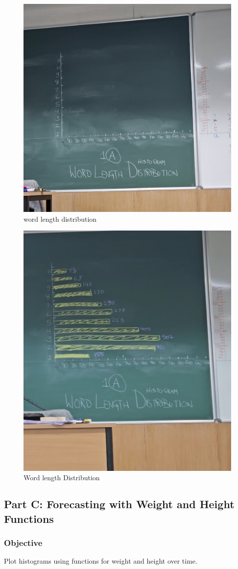 \documentclass{report}
\begin{document}
\begin{figure}
    \centering
    \includegraphics[width=0.6\linewidth , angle=270]{word length.jpg}
    \caption{word length distribution}
    \label{fig:word length}
\end{figure}

\begin{figure}
    \centering
    \includegraphics[width=0.7\linewidth]{word_length Distribution.jpeg}
    \caption{Word length Distribution}
    \label{fig:word length}
\end{figure}


\subsection{Part C: Forecasting with Weight and Height Functions}
\subsubsection*{Objective}
Plot histograms using functions for weight and height over time.
\end{document}
